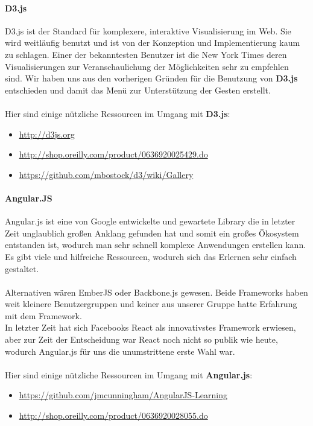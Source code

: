 \documentclass[10pt,a4paper]{report}
\begin{document}
				\paragraph{D3.js}
					D3.js ist der Standard für komplexere, interaktive Visualisierung im Web. Sie wird weitläufig benutzt und ist von der Konzeption und Implementierung kaum zu schlagen. Einer der bekanntesten Benutzer ist die New York Times deren Visualisierungen zur Veranschaulichung der Möglichkeiten sehr zu empfehlen sind.
					Wir haben uns aus den vorherigen Gründen für die Benutzung von \textbf{D3.js} entschieden und damit das Menü zur Unterstützung der Gesten erstellt.\\\\
					Hier sind einige nützliche Ressourcen im Umgang mit \textbf{D3.js}:
					\begin{itemize}
						\item \url{http://d3js.org}
						\item \url{http://shop.oreilly.com/product/0636920025429.do}
						\item \url{https://github.com/mbostock/d3/wiki/Gallery}
					\end{itemize}
				\paragraph{Angular.JS}
					Angular.js ist eine von Google entwickelte und gewartete Library die in letzter Zeit unglaublich großen Anklang gefunden hat und somit ein großes Ökosystem entstanden ist,	wodurch man sehr schnell komplexe Anwendungen erstellen kann. Es gibt viele und hilfreiche Ressourcen, wodurch sich das Erlernen sehr einfach gestaltet.\\\\
					Alternativen wären EmberJS oder Backbone.js gewesen. Beide Frameworks haben weit kleinere Benutzergruppen und keiner aus unserer Gruppe hatte Erfahrung mit dem Framework.\\
					In letzter Zeit hat sich Facebooks React als innovativstes Framework erwiesen, aber zur Zeit der Entscheidung war React noch nicht so publik wie heute, wodurch Angular.js für uns die unumstrittene erste Wahl war.\\\\
					Hier sind einige nützliche Ressourcen im Umgang mit \textbf{Angular.js}:
					\begin{itemize}
						\item \url{https://github.com/jmcunningham/AngularJS-Learning} 
						\item \url{http://shop.oreilly.com/product/0636920028055.do} 
					\end{itemize}
\end{document}
